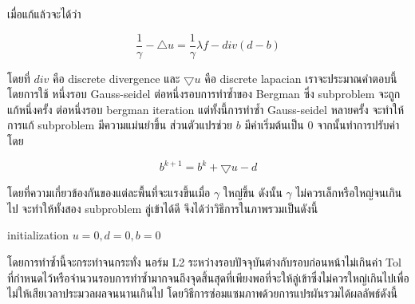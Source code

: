 \documentclass[hidelinks,a4paper,14pt]{article}
\numberwithin{equation}{section}							%
\begin{document}
{	เมื่อแก้แล้วจะได้ว่า
	
	$$ \frac{1}{\gamma} - \bigtriangleup u = \frac{1}{\gamma} \lambda f - div (d-b)$$
	
	โดยที่ $div$ คือ discrete divergence และ $\bigtriangledown u$ คือ discrete lapacian เราจะประมาณคำตอบนี้โดยการใช้ หนึ่งรอบ Gauss-seidel ต่อหนึ่งรอบการทำซ้ำของ Bergman ซึ่ง subproblem จะถูกแก้หนึ่งครั้ง ต่อหนึ่งรอบ bergman iteration แต่ทั้งนี้การทำซ้ำ Gauss-seidel หลายครั้ง จะทำให้การแก้ subproblem มีความแม่นยำขึ้น
	ส่วนตัวแปรช่วย $b$ มีค่าเริ่มต้นเป็น 0 จากนั้นทำการปรับค่าโดย
	
	$$ b^{k+1} = b^k  + \bigtriangledown u - d $$
	
	โดยที่ความเกี่ยวข้องกันของแต่ละพื้นที่จะแรงขึ้นเมื่อ $\gamma$ ใหญ่ขึ้น ดังนั้น $\gamma$ ไม่ควรเล็กหรือใหญ่จนเกินไป จะทำให้ทั้งสอง subproblem ลู่เข้าได้ดี
	จึงได้ว่าวิธีการในภาพรวมเป็นดังนี้
	


	\begin{algorithm}[H]
		\begin{framed}
		initialization $u = 0, d = 0, b = 0$\\
	\end{framed}
\end{algorithm}


	
	โดยการทำซ้ำนี้จะกระทำจนกระทั่ง นอร์ม L2 ระหว่างรอบปัจจุบันต่างกับรอบก่อนหน้าไม่เกินค่า Tol ที่กำหนดไว้หรือจำนวนรอบการทำซ้ำมากจนถึงจุดสิ้นสุดที่เพียงพอที่จะให้ลู่เข้าซึ่งไม่ควรใหญ่เกินไปเพื่อไม่ให้เสียเวลาประมวลผลจนนานเกินไป โดยวิธีการซ่อมแซมภาพด้วยการแปรผันรวมได้ผลลัพธ์ดังนี้
	
}
\end{document}
